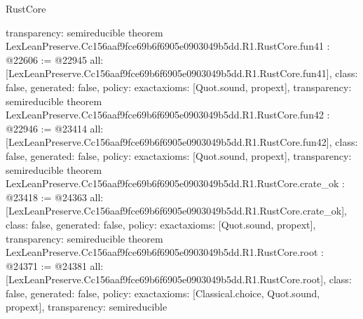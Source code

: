 \begin{lexlean}{RustCore}
\begin{coremodule}
{  transparency: semireducible
}
theorem LexLeanPreserve.Cc156aaf9fce69b6f6905e0903049b5dd.R1.RustCore.fun41 : @22606 := @22945 {
  all: [LexLeanPreserve.Cc156aaf9fce69b6f6905e0903049b5dd.R1.RustCore.fun41],
  class: false,
  generated: false,
  policy: exact{axioms: [Quot.sound, propext]},
  transparency: semireducible
}
theorem LexLeanPreserve.Cc156aaf9fce69b6f6905e0903049b5dd.R1.RustCore.fun42 : @22946 := @23414 {
  all: [LexLeanPreserve.Cc156aaf9fce69b6f6905e0903049b5dd.R1.RustCore.fun42],
  class: false,
  generated: false,
  policy: exact{axioms: [Quot.sound, propext]},
  transparency: semireducible
}
theorem LexLeanPreserve.Cc156aaf9fce69b6f6905e0903049b5dd.R1.RustCore.crate_ok : @23418 := @24363 {
  all: [LexLeanPreserve.Cc156aaf9fce69b6f6905e0903049b5dd.R1.RustCore.crate_ok],
  class: false,
  generated: false,
  policy: exact{axioms: [Quot.sound, propext]},
  transparency: semireducible
}
theorem LexLeanPreserve.Cc156aaf9fce69b6f6905e0903049b5dd.R1.RustCore.root : @24371 := @24381 {
  all: [LexLeanPreserve.Cc156aaf9fce69b6f6905e0903049b5dd.R1.RustCore.root],
  class: false,
  generated: false,
  policy: exact{axioms: [Classical.choice, Quot.sound, propext]},
  transparency: semireducible
}


\end{coremodule}
\end{lexlean}
